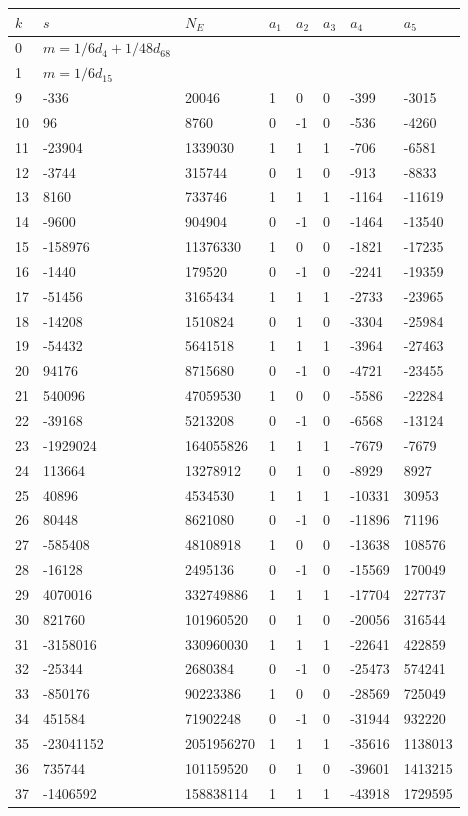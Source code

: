 \documentclass{amsart}
\begin{document}
\begin{longtable}{|l|l|l|lllll|}
\hline
$k$ & $s$ & $N_E$ & $a_1$ & $a_2$ & $a_3$ & $a_4$ & $a_5$\\
\hline
0&$m=1/6d_{4}+1/48d_{68}$&&\multicolumn{5}{c|}{}\\
1&$m=1/6d_{15}$&&\multicolumn{5}{c|}{}\\
9&-336&20046&1&0&0&-399&-3015\\
10&96&8760&0&-1&0&-536&-4260\\
11&-23904&1339030&1&1&1&-706&-6581\\
12&-3744&315744&0&1&0&-913&-8833\\
13&8160&733746&1&1&1&-1164&-11619\\
14&-9600&904904&0&-1&0&-1464&-13540\\
15&-158976&11376330&1&0&0&-1821&-17235\\
16&-1440&179520&0&-1&0&-2241&-19359\\
17&-51456&3165434&1&1&1&-2733&-23965\\
18&-14208&1510824&0&1&0&-3304&-25984\\
19&-54432&5641518&1&1&1&-3964&-27463\\
20&94176&8715680&0&-1&0&-4721&-23455\\
21&540096&47059530&1&0&0&-5586&-22284\\
22&-39168&5213208&0&-1&0&-6568&-13124\\
23&-1929024&164055826&1&1&1&-7679&-7679\\
24&113664&13278912&0&1&0&-8929&8927\\
25&40896&4534530&1&1&1&-10331&30953\\
26&80448&8621080&0&-1&0&-11896&71196\\
27&-585408&48108918&1&0&0&-13638&108576\\
28&-16128&2495136&0&-1&0&-15569&170049\\
29&4070016&332749886&1&1&1&-17704&227737\\
30&821760&101960520&0&1&0&-20056&316544\\
31&-3158016&330960030&1&1&1&-22641&422859\\
32&-25344&2680384&0&-1&0&-25473&574241\\
33&-850176&90223386&1&0&0&-28569&725049\\
34&451584&71902248&0&-1&0&-31944&932220\\
35&-23041152&2051956270&1&1&1&-35616&1138013\\
36&735744&101159520&0&1&0&-39601&1413215\\
37&-1406592&158838114&1&1&1&-43918&1729595\\

\end{longtable}
\end{document}
